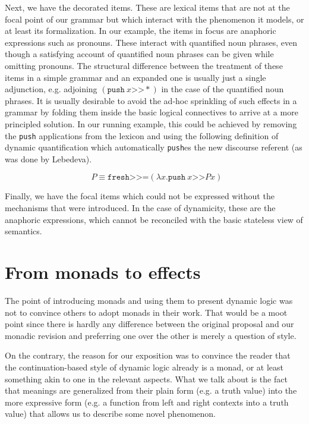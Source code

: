 \documentclass{article}
\newcommand{\dexists}{\mathop{\bar{\exists}}}
\newcommand{\hsbind}{\mathbin{\texttt{>>=}}}
\newcommand{\hsseq}{\mathbin{\texttt{>>}}}
\begin{document}
Next, we have the decorated items. These are lexical items that are not at the
focal point of our grammar but which interact with the phenomenon it models,
or at least its formalization. In our example, the items in focus are
anaphoric expressions such as pronouns. These interact with quantified noun
phrases, even though a satisfying account of quantified noun phrases can be
given while omitting pronouns. The structural difference between the treatment
of these items in a simple grammar and an expanded one is usually just a
single adjunction, e.g. adjoining $(\texttt{push}\ x \hsseq *)$ in the case of
the quantified noun phrases. It is usually desirable to avoid the ad-hoc
sprinkling of such effects in a grammar by folding them inside the basic
logical connectives to arrive at a more principled solution. In our running
example, this could be achieved by removing the \texttt{push} applications
from the lexicon and using the following definition of dynamic quantification
which automatically \texttt{push}es the new discourse referent (as was done by
Lebedeva).

$$
\dexists P \equiv \texttt{fresh} \hsbind (\lambda x. \texttt{push}\ x \hsseq P x)
$$

Finally, we have the focal items which could not be expressed without the
mechanisms that were introduced. In the case of dynamicity, these are the
anaphoric expressions, which cannot be reconciled with the basic stateless
view of semantics.


\section{From monads to effects}

The point of introducing monads and using them to present dynamic logic was
not to convince others to adopt monads in their work. That would be a moot
point since there is hardly any difference between the original proposal and
our monadic revision and preferring one over the other is merely a question of
style.

On the contrary, the reason for our exposition was to convince the reader that
the continuation-based style of dynamic logic already is a monad, or at least
something akin to one in the relevant aspects. What we talk about is the fact
that meanings are generalized from their plain form (e.g. a truth value) into
the more expressive form (e.g. a function from left and right contexts into a
truth value) that allows us to describe some novel phenomenon.
\end{document}
